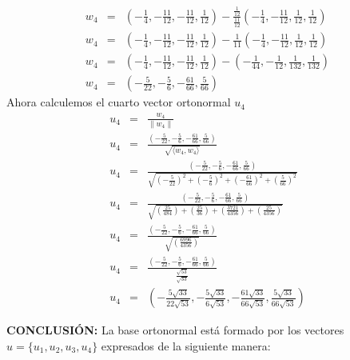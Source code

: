 \begin{enumerate}
\begin{eqnarray}
        {w}_{4} &=& \left(- \frac{1}{4},- \frac{11}{12},- \frac{11}{12}, \frac{1}{12} \right) - \frac{\frac{1}{12}}{\frac{11}{12}} \left(- \frac{1}{4},- \frac{11}{12}, \frac{1}{12}, \frac{1}{12} \right) \nonumber \\
        {w}_{4} &=& \left(- \frac{1}{4},- \frac{11}{12},- \frac{11}{12}, \frac{1}{12} \right) - \frac{1}{11} \left(- \frac{1}{4},- \frac{11}{12}, \frac{1}{12}, \frac{1}{12} \right) \nonumber \\
        {w}_{4} &=& \left(- \frac{1}{4},- \frac{11}{12},- \frac{11}{12}, \frac{1}{12} \right) - \left(- \frac{1}{44},- \frac{1}{12}, \frac{1}{132}, \frac{1}{132} \right)  \nonumber \\
        {w}_{4} &=& \left(- \frac{5}{22},- \frac{5}{6},- \frac{61}{66}, \frac{5}{66} \right) \nonumber
    \end{eqnarray}
    Ahora calculemos el cuarto vector ortonormal ${u}_{4}$
    \begin{eqnarray}
        {u}_{4} &=& \frac{{w}_{4}}{\|{w}_{4} \|} \nonumber \\
        {u}_{4} &=& \frac{\left(- \frac{5}{22},- \frac{5}{6},- \frac{61}{66}, \frac{5}{66} \right)}{\sqrt{\langle {w}_{4}, {w}_{4} \rangle}} \nonumber \\
        {u}_{4} &=& \frac{\left(- \frac{5}{22},- \frac{5}{6},- \frac{61}{66}, \frac{5}{66} \right)}{\sqrt{{\left(-\frac{5}{22} \right)}^{2}+{\left(-\frac{5}{6} \right)}^{2}+{\left(-\frac{61}{66} \right)}^{2}+{\left(\frac{5}{66} \right)}^{2}}} \nonumber \\
        {u}_{4} &=& \frac{\left(- \frac{5}{22},- \frac{5}{6},- \frac{61}{66}, \frac{5}{66} \right)}{\sqrt{\left(\frac{25}{484}\right) + \left(\frac{25}{36}\right) + \left(\frac{3721}{4356}\right) + \left(\frac{25}{4356}\right) }} \nonumber \\
        {u}_{4} &=& \frac{\left(- \frac{5}{22},- \frac{5}{6},- \frac{61}{66}, \frac{5}{66} \right)}{\sqrt{\left( \frac{6996}{4356} \right) }} \nonumber \\
        {u}_{4} &=& \frac{\left(- \frac{5}{22},- \frac{5}{6},- \frac{61}{66}, \frac{5}{66} \right)}{\frac{\sqrt{53}}{\sqrt{33}}} \nonumber \\
        {u}_{4} &=& \left(- \frac{5 \sqrt{33}}{22 \sqrt{53}},- \frac{5 \sqrt{33}}{6 \sqrt{53}},- \frac{61 \sqrt{33}}{66 \sqrt{53}}, \frac{5 \sqrt{33}}{66 \sqrt{53}} \right) \nonumber
    \end{eqnarray}
\end{enumerate}

\textbf{CONCLUSIÓN:} La base ortonormal está formado por los vectores $u = \{ {u}_{1}, {u}_{2} , {u}_{3}, {u}_{4} \}$ expresados de la siguiente manera:

